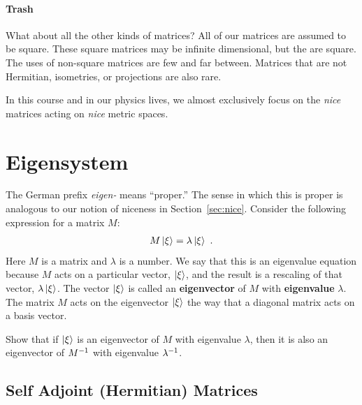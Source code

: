 \documentclass[12pt]{article}
\begin{document}
\paragraph{Trash} What about all the other kinds of matrices? All of our matrices are assumed to be square. These square matrices may be infinite dimensional, but the are square. The uses of non-square matrices are few and far between. Matrices that are not Hermitian, isometries, or projections are also rare. 

\vspace{1em}

In this course and in our physics lives, we almost exclusively focus on the \emph{nice} matrices acting on \emph{nice} metric spaces. 



\section{Eigensystem}
\label{sec:eigensystem}

The German prefix \emph{eigen-} means ``proper.'' The sense in which this is proper is analogous to our notion of niceness in Section~\ref{sec:nice}. Consider the following expression for a matrix $M$:
\begin{align}
    M\left|\xi\right\rangle = \lambda\left|\xi\right\rangle \ .
\end{align}
Here $M$ is a matrix and $\lambda$ is a number. We say that this is an eigenvalue equation because $M$ acts on a particular vector, $\left|\xi\right\rangle$, and the result is a rescaling of that vector, $\lambda\left|\xi\right\rangle$. The vector $\left|\xi\right\rangle$ is called an \textbf{eigenvector} of $M$ with \textbf{eigenvalue} $\lambda$.  The matrix $M$ acts on the eigenvector $\left|\xi\right\rangle$ the way that a diagonal matrix acts on a basis vector.
 
\begin{exercise}
Show that if $\left|\xi\right\rangle$ is an eigenvector of $M$ with eigenvalue $\lambda$, then it is also an eigenvector of $M^{-1}$ with eigenvalue $\lambda^{-1}$. 
\end{exercise}

\subsection{Self Adjoint (Hermitian) Matrices}
\end{document}
